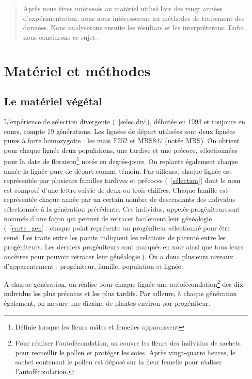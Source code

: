 \documentclass[12pt,a4paper]{article}
\begin{document}
			\begin{quotation}
				Après nous êtres intéressés au matériel utilisé lors des vingt années d'expérimentation, nous nous intéresserons au méthodes de traitement des données. Nous analyserons ensuite les résultats et les interpréterons. Enfin, nous conclurons ce sujet.
			\end{quotation}
			
			
			 \section{Matériel et méthodes}
			 		
			 		\subsection{Le matériel végétal}
			 			
			 			L'expérience de sélection divergente (~\ref{selec.div}), débutée en 1993 et toujours en cours, compte 19 générations. Les lignées de départ utilisées sont deux lignées pures à forte homozygotie : les maïs F252 et MBS847 (notée MBS). On obtient pour chaque lignée deux populations, une tardive et une précoce, sélectionnées pour la date de floraison\footnote{Définie lorsque les fleurs mâles et femelles apparaissent} notée en degrés-jours. On replante également chaque année la lignée pure de départ comme témoin.
			 			Par ailleurs, chaque lignée est représentée par plusieurs familles tardives et précoces (~\ref{sélection}) dont le nom est composé d'une lettre suivie de deux ou trois chiffres. Chaque famille est représentée chaque année par un certain nombre de descendants des individus sélectionnés à la génération précédente. Ces individus, appelés \og progéniteurs\fg sont nommés d'une façon qui permet de retracer facilement leur généalogie (~\ref{carte_gen} : chaque point représente un progéniteur sélectionné pour être semé. Les traits entre les points indiquent les relations de parenté entre les progéniteurs. Les derniers progéniteurs sont marqués en noir ainsi que tous leurs ancêtres pour pouvoir retracer leur généalogie.). On a donc plusieurs niveaux d'apparentement : progéniteur, famille, population et lignée.
			 			
			 			A chaque génération, on réalise pour chaque lignée une autofécondation\footnote{Pour réaliser l'autofécondation, on couvre les fleurs des individus de sachets pour recueillir le pollen et protéger les soies. Après vingt-quatre heures, le sachet contenant le pollen est déposé sur la fleur femelle pour réaliser l'autofécondation.} des dix individus les plus précoces et les plus tardifs. Par ailleurs, à chaque génération également, on mesure une dizaine de plantes environ par progéniteur.
			 			
\end{document}
